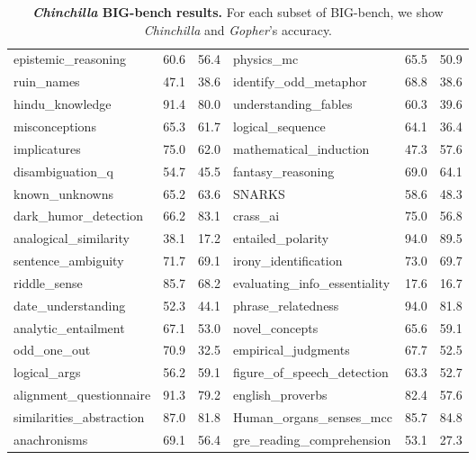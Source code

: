 \documentclass[11pt, a4paper, logo, copyright, nonumbering]{deepmind}
\newcommand{\gopher}{\textit{Gopher}\xspace}
\newcommand{\chinchilla}{\textit{Chinchilla}\xspace}
\newcommand{\bigbench}{BIG-bench\xspace}
\begin{document}
\begin{table}[ht]
\begin{tabular}{lll|lll}
                  epistemic\_reasoning &  60.6 &  56.4 &                           physics\_mc &  65.5 &  50.9 \\
                           ruin\_names &  47.1 &  38.6 &                identify\_odd\_metaphor &  68.8 &  38.6 \\
                      hindu\_knowledge &  91.4 &  80.0 &                 understanding\_fables &  60.3 &  39.6 \\
                       misconceptions &  65.3 &  61.7 &                     logical\_sequence &  64.1 &  36.4 \\
                         implicatures &  75.0 &  62.0 &               mathematical\_induction &  47.3 &  57.6 \\
                     disambiguation\_q &  54.7 &  45.5 &                    fantasy\_reasoning &  69.0 &  64.1 \\
                       known\_unknowns &  65.2 &  63.6 &                               SNARKS &  58.6 &  48.3 \\
                 dark\_humor\_detection &  66.2 &  83.1 &                             crass\_ai &  75.0 &  56.8 \\
                analogical\_similarity &  38.1 &  17.2 &                    entailed\_polarity &  94.0 &  89.5 \\
                   sentence\_ambiguity &  71.7 &  69.1 &                 irony\_identification &  73.0 &  69.7 \\
                         riddle\_sense &  85.7 &  68.2 &  evaluating\_info\_essentiality &  17.6 &  16.7 \\
                   date\_understanding &  52.3 &  44.1 &                   phrase\_relatedness &  94.0 &  81.8 \\
                  analytic\_entailment &  67.1 &  53.0 &                       novel\_concepts &  65.6 &  59.1 \\
                          odd\_one\_out &  70.9 &  32.5 &                  empirical\_judgments &  67.7 &  52.5 \\
                         logical\_args &  56.2 &  59.1 &           figure\_of\_speech\_detection &  63.3 &  52.7 \\
              alignment\_questionnaire &  91.3 &  79.2 &                     english\_proverbs &  82.4 &  57.6 \\
             similarities\_abstraction &  87.0 &  81.8 &  Human\_organs\_senses\_mcc &  85.7 &  84.8 \\
                         anachronisms &  69.1 &  56.4 &            gre\_reading\_comprehension &  53.1 &  27.3 \\
\bottomrule
\end{tabular}

    \caption{\textbf{\chinchilla \bigbench results.} For each subset of \bigbench \citep{bigbench}, we show \chinchilla and \gopher's accuracy.
    }
    \label{tab:bigbench}
\end{table}
\end{document}
